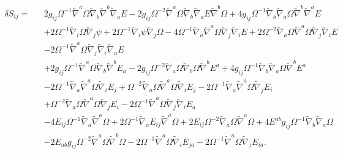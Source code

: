 \documentclass[10pt,letterpaper]{article}
\numberwithin{equation}{section}
\begin{document}
\begin{appendices}
\begin{eqnarray}
\delta S_{ij}=&&2 g_{ij} \Omega^{-1} \tilde{\nabla}^{a}\Omega \tilde{\nabla}_{b}\tilde{\nabla}^{b}\tilde{\nabla}_{a}E
 - 2 g_{ij} \Omega^{-2} \tilde{\nabla}^{a}\Omega \tilde{\nabla}_{b}\tilde{\nabla}_{a}E \tilde{\nabla}^{b}\Omega
 + 4 g_{ij} \Omega^{-1} \tilde{\nabla}_{b}\tilde{\nabla}_{a}\Omega \tilde{\nabla}^{b}\tilde{\nabla}^{a}E
\nonumber\\
&& + 2 \Omega^{-1} \tilde{\nabla}_{i}\Omega \tilde{\nabla}_{j}\psi
 + 2 \Omega^{-1} \tilde{\nabla}_{i}\psi \tilde{\nabla}_{j}\Omega
 - 4 \Omega^{-1} \tilde{\nabla}_{a}\tilde{\nabla}^{a}\Omega \tilde{\nabla}_{j}\tilde{\nabla}_{i}E
 + 2 \Omega^{-2} \tilde{\nabla}_{a}\Omega \tilde{\nabla}^{a}\Omega \tilde{\nabla}_{j}\tilde{\nabla}_{i}E
\nonumber\\
&& - 2 \Omega^{-1} \tilde{\nabla}^{a}\Omega \tilde{\nabla}_{j}\tilde{\nabla}_{i}\tilde{\nabla}_{a}E
\nonumber\\
&&+2 g_{ij} \Omega^{-1} \tilde{\nabla}^{a}\Omega \tilde{\nabla}_{b}\tilde{\nabla}^{b}E_{a}
 - 2 g_{ij} \Omega^{-2} \tilde{\nabla}_{a}\Omega \tilde{\nabla}_{b}\Omega \tilde{\nabla}^{b}E^{a}
 + 4 g_{ij} \Omega^{-1} \tilde{\nabla}_{b}\tilde{\nabla}_{a}\Omega \tilde{\nabla}^{b}E^{a}
\nonumber\\
&& - 2 \Omega^{-1} \tilde{\nabla}_{a}\tilde{\nabla}^{a}\Omega \tilde{\nabla}_{i}E_{j}
 + \Omega^{-2} \tilde{\nabla}_{a}\Omega \tilde{\nabla}^{a}\Omega \tilde{\nabla}_{i}E_{j}
 - 2 \Omega^{-1} \tilde{\nabla}_{a}\tilde{\nabla}^{a}\Omega \tilde{\nabla}_{j}E_{i}
\nonumber\\
&& + \Omega^{-2} \tilde{\nabla}_{a}\Omega \tilde{\nabla}^{a}\Omega \tilde{\nabla}_{j}E_{i}
 - 2 \Omega^{-1} \tilde{\nabla}^{a}\Omega \tilde{\nabla}_{j}\tilde{\nabla}_{i}E_{a}
\nonumber\\
&&-4 E_{ij} \Omega^{-1} \tilde{\nabla}_{a}\tilde{\nabla}^{a}\Omega
 + 2 \Omega^{-1} \tilde{\nabla}_{a}E_{ij} \tilde{\nabla}^{a}\Omega
 + 2 E_{ij} \Omega^{-2} \tilde{\nabla}_{a}\Omega \tilde{\nabla}^{a}\Omega
 + 4 E^{ab} g_{ij} \Omega^{-1} \tilde{\nabla}_{b}\tilde{\nabla}_{a}\Omega\nonumber\\
&& - 2 E_{ab} g_{ij} \Omega^{-2} \tilde{\nabla}^{a}\Omega \tilde{\nabla}^{b}\Omega
 - 2 \Omega^{-1} \tilde{\nabla}^{a}\Omega \tilde{\nabla}_{i}E_{ja}
 - 2 \Omega^{-1} \tilde{\nabla}^{a}\Omega \tilde{\nabla}_{j}E_{ia}.
\label{dSsvt}
\end{eqnarray}


\end{appendices}
\end{document}
